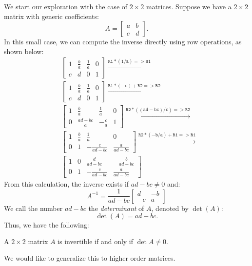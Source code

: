\documentclass[12pt]{article}
\begin{document}
We start our exploration with the case of $2\times 2$ matrices. Suppose we have a $2\times2$ matrix with generic coefficients:
\[
A=\begin{bmatrix}a&b\\c&d\end{bmatrix}.
\]
In this small case, we can compute the inverse directly using row operations, as shown below:
\begin{align*}
&\left[\begin{matrix}1 & \frac{b}{a} & \frac{1}{a} & 0\\c & d & 0 & 1\end{matrix}\right]
\xrightarrow{\mathtt{R1*(1/a)=>R1}}\\
&\left[\begin{matrix}1 & \frac{b}{a} & \frac{1}{a} & 0\\c & d & 0 & 1\end{matrix}\right]
\xrightarrow{\mathtt{R1*(-c)+R2=>R2}}\\
&\left[\begin{matrix}1 & \frac{b}{a} & \frac{1}{a} & 0\\0 & \frac{a d - b c}{a} & - \frac{c}{a} & 1\end{matrix}\right]
\xrightarrow{\mathtt{R2*((ad-bc)/c)=>R2}}\\
&\left[\begin{matrix}1 & \frac{b}{a} & \frac{1}{a} & 0\\0 & 1 & - \frac{c}{a d - b c} & \frac{a}{a d - b c}\end{matrix}\right]
\xrightarrow{\mathtt{R2*(-b/a)+R1=>R1}}\\
&\left[\begin{matrix}1 & 0 & \frac{d}{a d - b c} & - \frac{b}{a d - b c}\\0 & 1 & - \frac{c}{a d - b c} & \frac{a}{a d - b c}\end{matrix}\right]
\end{align*}
From this calculation, the inverse exists if $ad-bc\ne0$ and:
\[
A^{-1}=\frac{1}{ad-bc}\begin{bmatrix}d&-b\\-c&a\end{bmatrix}
\]
We call the number $ad-bc$ the \emph{determinant} of $A$, denoted by $\det(A)$:
\[
\det(A)=ad-bc.
\]
Thus, we have the following:
\begin{proposition} 
A $2\times2$ matrix $A$ is invertible if and only if $\det{A}\ne0$.
\end{proposition}
We would like to generalize this to higher order matrices.
\end{document}
